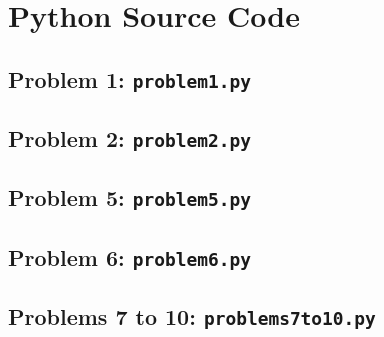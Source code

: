 \section{Python Source Code}
\label{app:code}

\subsection{Problem 1: \texttt{problem1.py}}
\label{app:p1-code}


\clearpage
\subsection{Problem 2: \texttt{problem2.py}}
\label{app:p2-code}


\clearpage
\subsection{Problem 5: \texttt{problem5.py}}
\label{app:p5-code}


\clearpage
\subsection{Problem 6: \texttt{problem6.py}}
\label{app:p6-code}


\clearpage
\subsection{Problems 7 to 10: \texttt{problems7to10.py}}
\label{app:p7-10-code}

